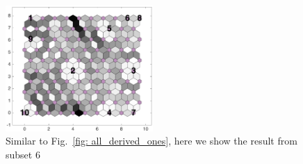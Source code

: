 \begin{figure}
        \centering
        \includegraphics[width=0.5\textwidth]{../../images0.01/M31/2D/image_subsets/subset4_dist_with_hits_t.png}
    \caption{Similar to Fig.~\ref{fig: all_derived_ones}, here we show the result  from subset 6}
    \label{fig: subset4}
\end{figure}
